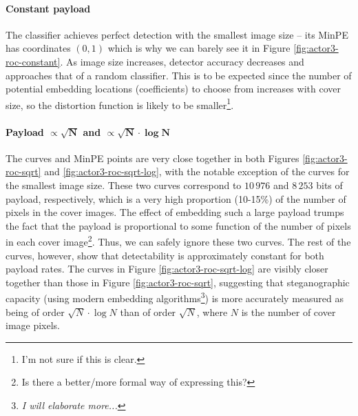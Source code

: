 \documentclass[11pt,a4paper,twoside,openright]{report}
\begin{document}
\paragraph{Constant payload} The classifier achieves perfect detection with the smallest image size -- its MinPE has coordinates $(0,1)$ which is why we can barely see it in Figure \ref{fig:actor3-roc-constant}. As image size increases, detector accuracy decreases and approaches that of a random classifier. This is to be expected since the number of potential embedding locations (coefficients) to choose from increases with cover size, so the distortion function is likely to be smaller\footnote{I'm not sure if this is clear.}.

\paragraph{Payload $\bm{\propto \sqrt{N}}$ and $\bm{\propto \sqrt{N} \cdot \log{N}}$} The curves and MinPE points are very close together in both Figures \ref{fig:actor3-roc-sqrt} and \ref{fig:actor3-roc-sqrt-log}, with the notable exception of the curves for the smallest image size. These two curves correspond to $10\,976$ and $8\,253$ bits of payload, respectively, which is a very high proportion (10-15\%) of the number of pixels in the cover images. The effect of embedding such a large payload trumps the fact that the payload is proportional to some function of the number of pixels in each cover image\footnote{Is there a better/more formal way of expressing this?}. Thus, we can safely ignore these two curves. The rest of the curves, however, show that detectability is approximately constant for both payload rates. The curves in Figure \ref{fig:actor3-roc-sqrt-log} are visibly closer together than those in Figure \ref{fig:actor3-roc-sqrt}, suggesting that steganographic capacity (using modern embedding algorithms\footnote{\textit{I will elaborate more...}}) is more accurately measured as being of order $\sqrt{N} \cdot \log{N}$ than of order $\sqrt{N}$, where $N$ is the number of cover image pixels.
\end{document}
